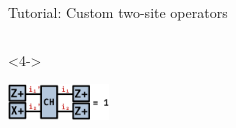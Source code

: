 \begin{frame}[fragile]{Tutorial: Custom two-site operators}
\begin{columns}
\begin{column}{5cm}
\begin{onlyenv}<4->
\vspace*{0.0cm}
\begin{center}
\includegraphics[width=0.2\textwidth]{
  slides/assets/Zp1Xp2CHZp1Zp2.png
}
\end{center}
\vspace*{0.0cm}
\end{onlyenv}

\end{column}

\end{columns}

\end{frame}
